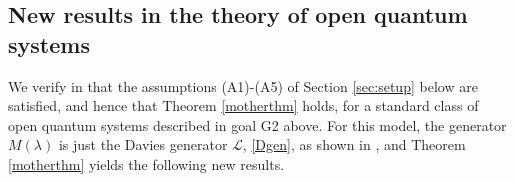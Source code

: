 \documentclass[letterpaper,onecolumn,11pt,accepted=2021-12-09]{quantumarticle}
\numberwithin{equation}{section}
\begin{document}
\subsection{New results in the theory of open quantum systems}


We verify in \cite{Markov2} that the assumptions (A1)-(A5) of Section \ref{sec:setup} below are satisfied, and hence that Theorem \ref{motherthm} holds, for a standard class of open quantum systems described in goal G2 above. For this model, the generator $M(\lambda)$ is just the Davies generator $\mathcal L$, \eqref{Dgen}, as shown in \cite{MAOP}, and Theorem \ref{motherthm} yields the following new results.
\end{document}
